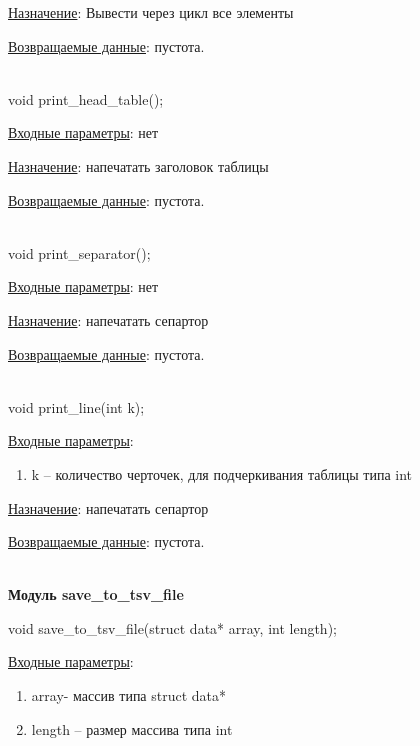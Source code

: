 \underline{Назначение}: Вывести через цикл все элементы

\underline{Возвращаемые данные}: пустота.

\hspace{0pt}\\



void print\_head\_table();

\underline{Входные параметры}: нет

\underline{Назначение}: напечатать заголовок таблицы

\underline{Возвращаемые данные}: пустота.

\hspace{0pt}\\



void print\_separator();

\underline{Входные параметры}: нет

\underline{Назначение}: напечатать сепартор 

\underline{Возвращаемые данные}: пустота.

\hspace{0pt}\\



void print\_line(int k);

\underline{Входные параметры}:

\begin{enumerate}
    \item k – количество черточек, для подчеркивания таблицы типа int
\end{enumerate}

\underline{Назначение}: напечатать сепартор 

\underline{Возвращаемые данные}: пустота.

\hspace{0pt}\\



\textbf{Модуль save\_to\_tsv\_file}

void save\_to\_tsv\_file(struct data* array, int length);

\underline{Входные параметры}: 

\begin{enumerate}
    \item array- массив типа struct data*
    \item length – размер массива типа int
\end{enumerate}

